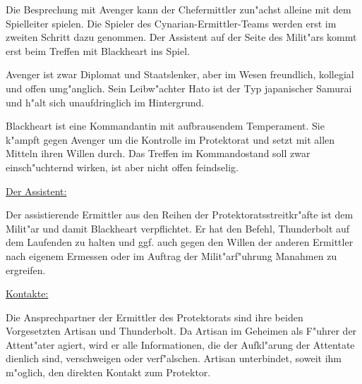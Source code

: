 
\begin{remarks}
	Die Besprechung mit Avenger kann der Chefermittler zun"achst alleine mit dem Spielleiter spielen. Die Spieler des Cynarian-Ermittler-Teams werden erst im zweiten Schritt dazu genommen. Der Assistent auf der Seite des Milit"ars kommt erst beim Treffen mit Blackheart ins Spiel.

	Avenger ist zwar Diplomat und Staatslenker, aber im Wesen freundlich, kollegial und offen umg"anglich. Sein Leibw"achter Hato ist der Typ japanischer Samurai und h"alt sich unaufdringlich im Hintergrund.
	
	Blackheart ist eine Kommandantin mit aufbrausendem Temperament. Sie k"ampft gegen Avenger um die Kontrolle im Protektorat und setzt mit allen Mitteln ihren Willen durch. Das Treffen im Kommandostand soll zwar einsch"uchternd wirken, ist aber nicht offen feindselig.
	
	\underline{Der Assistent:}
	
	Der assistierende Ermittler aus den Reihen der Protektoratsstreitkr"afte ist dem Milit"ar und damit Blackheart verpflichtet. Er hat den Befehl, Thunderbolt auf dem Laufenden zu halten und ggf. auch gegen den Willen der anderen Ermittler nach eigenem Ermessen oder im Auftrag der Milit"arf"uhrung Ma\3nahmen zu ergreifen.
	
	\underline{Kontakte:}
	
	Die Ansprechpartner der Ermittler des Protektorats sind ihre beiden Vorgesetzten Artisan und Thunderbolt. Da Artisan im Geheimen als F"uhrer der Attent"ater agiert, wird er alle Informationen, die der Aufkl"arung der Attentate dienlich sind, verschweigen oder verf"alschen. Artisan unterbindet, soweit ihm m"oglich, den direkten Kontakt zum Protektor.
\end{remarks}

